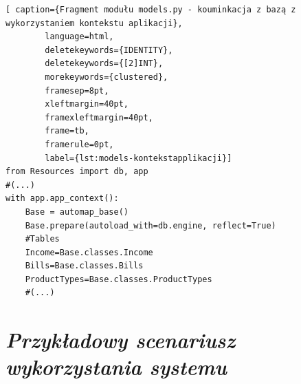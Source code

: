 \documentclass[a4paper,10pt, twoside]{report}
\newcommand{\customstylechapter}[1]{\large{\textit{#1}}}
\begin{document}
\begin{large}
\begin{minipage}{\textwidth}
    \begin{lstlisting}[ caption={Fragment modułu models.py - kouminkacja z bazą z wykorzystaniem kontekstu aplikacji},
        language=html,
        deletekeywords={IDENTITY},
        deletekeywords={[2]INT},
        morekeywords={clustered},
        framesep=8pt,
        xleftmargin=40pt,
        framexleftmargin=40pt,
        frame=tb,
        framerule=0pt,
        label={lst:models-kontekstapplikacji}]
from Resources import db, app
#(...)
with app.app_context():
    Base = automap_base() 
    Base.prepare(autoload_with=db.engine, reflect=True)
    #Tables
    Income=Base.classes.Income
    Bills=Base.classes.Bills
    ProductTypes=Base.classes.ProductTypes
    #(...)\end{lstlisting}
\end{minipage}


\chapter{\customstylechapter{Przykładowy scenariusz wykorzystania systemu}}
{}


\end{large}
\end{document}
